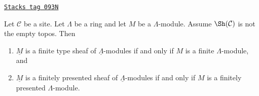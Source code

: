 \begin{lemma}
\label{sites-modules-lemma-locally-constant-finite-type}
\href{https://stacks.math.columbia.edu/tag/093N}{\texttt{Stacks tag 093N}}

Let $\mathcal{C}$ be a site. Let $\Lambda$ be a ring and let $M$ be a
$\Lambda$-module. Assume $\Sh(\mathcal{C})$ is not the empty topos. Then
\begin{enumerate}
\item $\underline{M}$ is a finite type sheaf of $\underline{\Lambda}$-modules
if and only if $M$ is a finite $\Lambda$-module, and
\item $\underline{M}$ is a finitely presented sheaf of
$\underline{\Lambda}$-modules if and only if $M$ is a
finitely presented $\Lambda$-module.
\end{enumerate}
\end{lemma}

